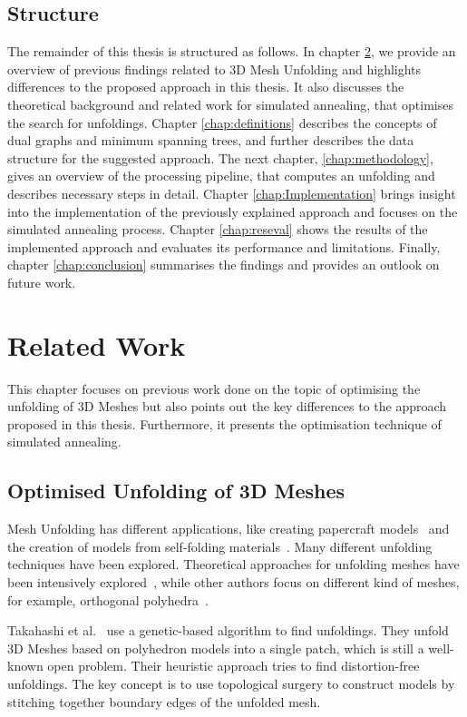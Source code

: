 \documentclass[draft,final]{vutinfth} %
\begin{document}
\section{Structure}
The remainder of this thesis is structured as follows.
In chapter \ref{chap:relatedwork}, we provide an overview of previous findings related to 3D Mesh Unfolding and highlights differences to the proposed approach in this thesis. It also discusses the theoretical background and related work for simulated annealing, that optimises the search for unfoldings. Chapter \ref{chap:definitions} describes the concepts of dual graphs and minimum spanning trees, and further describes the data structure for the suggested approach. The next chapter, \ref{chap:methodology}, gives an overview of the processing pipeline, that computes an unfolding and describes necessary steps in detail. Chapter \ref{chap:Implementation} brings insight into the implementation of the previously explained approach and focuses on the simulated annealing process. Chapter \ref{chap:reseval} shows the results of the implemented approach and evaluates its performance and limitations. Finally, chapter \ref{chap:conclusion} summarises the findings and provides an outlook on future work.

\chapter{Related Work}
\label{chap:relatedwork}
This chapter focuses on previous work done on the topic of optimising the unfolding of 3D Meshes but also points out the key differences to the approach proposed in this thesis. Furthermore, it presents the optimisation technique of simulated annealing.

\section{Optimised Unfolding of 3D Meshes}
Mesh Unfolding has different applications, like creating papercraft models~\cite{takahashi2011optimized,straubcreating} and the creation of models from self-folding materials~\cite{felton2013self,tibbits20144d}. Many different unfolding techniques have been explored. Theoretical approaches for unfolding meshes have been intensively explored~\cite{shephard1975convex}, while other authors focus on different kind of meshes, for example, orthogonal polyhedra~\cite{xi2016learning,damian2007epsilon,damian2014unfolding}.

Takahashi et al.~\cite{takahashi2011optimized} use a genetic-based algorithm to find unfoldings. They unfold 3D Meshes based on polyhedron models into a single patch, which is still a well-known open problem. Their heuristic approach tries to find distortion-free unfoldings. The key concept is to use topological surgery to construct models by stitching together boundary edges of the unfolded mesh.
\end{document}
